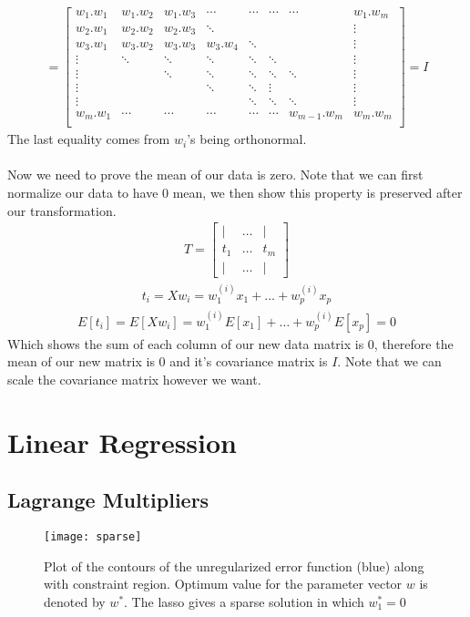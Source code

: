 \documentclass[12pt,onecolumn,a4paper]{article}
\begin{document}
\begin{align*}
	= 
	\begin{bmatrix}
		w_1.w_1  & w_1.w_2  & w_1.w_3 & \cdots & \cdots & \cdots & \cdots & w_1.w_m \\
		w_2.w_1  & w_2.w_2  & w_2.w_3  & \ddots & && & \vdots \\
		w_3.w_1 & w_3.w_2  & w_3.w_3 & w_3.w_4  & \ddots & &  & \vdots \\
		\vdots & \ddots & \ddots & \ddots & \ddots & \ddots &  & \vdots \\
		\vdots & & \ddots & \ddots & \ddots & \ddots & \ddots& \vdots\\
		\vdots  & & & \ddots & \ddots  & \vdots  &   & \vdots\\
		\vdots  & && & \ddots & \ddots  & \ddots  &  \vdots \\
		w_m.w_1 & \cdots &  \cdots & \cdots & \cdots & \cdots & w_{m - 1}.w_m  & w_m.w_m  \\
	\end{bmatrix} = I
\end{align*}
The last equality comes from $w_i$'s being orthonormal.
\\ \\
Now we need to prove the mean of our data is zero. Note that we can first normalize our data to have 0 mean, we then show this property is preserved after our transformation.
\begin{align*}
	T =  \begin{bmatrix}
			\vert & \dots  &\vert \\
			t_1   & \dots & t_m   \\
			\vert & \dots &\vert
		\end{bmatrix} 
\end{align*}
\begin{align*}
	t_i = Xw_i = w^{(i)}_1x_1 + \dots + w^{(i)}_{p}x_p
\end{align*}
\begin{align*}
	E[t_i] = E[Xw_i] = w^{(i)}_1E[x_1] + \dots + w^{(i)}_pE[x_p] = 0
\end{align*}
Which shows the sum of each column of our new data matrix is 0, therefore the mean of our new matrix is 0 and it's covariance matrix is $I$. Note that we can scale the covariance matrix however we want.
\section{Linear Regression}

\subsection{Lagrange Multipliers}
\begin{SCfigure}[0.5][h]
	\caption{Plot of the contours of the unregularized error function (blue) along with constraint region. Optimum value for the parameter vector $w$ is denoted by $w^*$. The lasso gives a sparse solution in which $w_1^* = 0$}
	\texttt{[image: sparse]}
\end{SCfigure}
\end{document}
